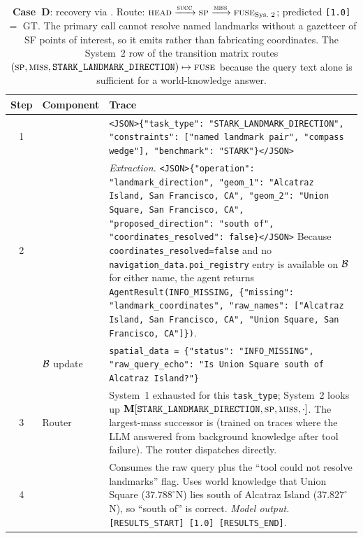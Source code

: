 \begin{table}[H]
\centering
\caption{\textbf{Case~D}: recovery via \smiss.  Route: $\textnormal{\textsc{head}} \xrightarrow{\textnormal{\textsc{succ}}} \textnormal{\textsc{sp}} \xrightarrow{\textnormal{\textsc{miss}}} \textnormal{\textsc{fuse}}_{\text{Sys.~2}}$; predicted \texttt{[1.0]} $=$ GT.  The primary \ssp{} call cannot resolve named landmarks without a gazetteer of SF points of interest, so it emits \smiss{} rather than fabricating coordinates.  The System~2 row of the transition matrix routes $(\textnormal{\textsc{sp}}, \textnormal{\textsc{miss}}, \texttt{STARK\_LANDMARK\_DIRECTION}) \mapsto \textnormal{\textsc{fuse}}$ because the query text alone is sufficient for a world-knowledge answer.}
\label{tab:case_d}
\small
\begin{tabular}{c l p{10.5cm}}
\toprule
Step & Component & Trace \\
\midrule
1 & \shead{} &
\texttt{<JSON>\{"task\_type": "STARK\_LANDMARK\_DIRECTION", "constraints": ["named landmark pair", "compass wedge"], "benchmark": "STARK"\}</JSON>} \\
\midrule
2 & \ssp{} &
\textit{Extraction.}  \texttt{<JSON>\{"operation": "landmark\_direction", "geom\_1": "Alcatraz Island, San Francisco, CA", "geom\_2": "Union Square, San Francisco, CA", "proposed\_direction": "south of", "coordinates\_resolved": false\}</JSON>} \newline
Because \texttt{coordinates\_resolved=false} and no \texttt{navigation\_data.poi\_registry} entry is available on $\mathcal{B}$ for either name, the agent returns \texttt{AgentResult(INFO\_MISSING, \{"missing": "landmark\_coordinates", "raw\_names": ["Alcatraz Island, San Francisco, CA", "Union Square, San Francisco, CA"]\})}. \\
\midrule
  & $\mathcal{B}$ update &
\texttt{spatial\_data = \{"status": "INFO\_MISSING", "raw\_query\_echo": "Is Union Square south of Alcatraz Island?"\}} \\
\midrule
3 & Router &
System~1 exhausted for this \texttt{task\_type}; System~2 looks up $\mathbf{M}[\texttt{STARK\_LANDMARK\_DIRECTION}, \textnormal{\textsc{sp}}, \textnormal{\textsc{miss}}, \cdot]$.  The largest-mass successor is \sfuse{} (trained on traces where the LLM answered from background knowledge after tool failure).  The router dispatches \sfuse{} directly. \\
\midrule
4 & \sfuse{} &
Consumes the raw query plus the ``tool could not resolve landmarks'' flag.  Uses world knowledge that Union Square ($37.788^{\circ}$N) lies south of Alcatraz Island ($37.827^{\circ}$N), so ``south of'' is correct. \newline
\textit{Model output.} \texttt{[RESULTS\_START] [1.0] [RESULTS\_END]}. \\
\bottomrule
\end{tabular}
\end{table}
\FloatBarrier
